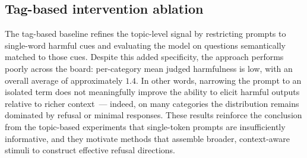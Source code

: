 \documentclass{article}
\theoremstyle{plain}
\theoremstyle{definition}
\theoremstyle{remark}
\begin{document}

\newpage
\subsection{Tag-based intervention ablation} \label{subsec:tag_ablation}

The tag-based baseline refines the topic-level signal by restricting prompts to single-word harmful cues and evaluating the model on questions semantically matched to those cues. Despite this added specificity, the approach performs poorly across the board: per-category mean judged harmfulness is low, with an overall average of approximately $1.4$. In other words, narrowing the prompt to an isolated term does not meaningfully improve the ability to elicit harmful outputs relative to richer context~--- indeed, on many categories the distribution remains dominated by refusal or minimal responses. These results reinforce the conclusion from the topic-based experiments that single-token prompts are insufficiently informative, and they motivate methods that assemble broader, context-aware stimuli to construct effective refusal directions.
\end{document}

